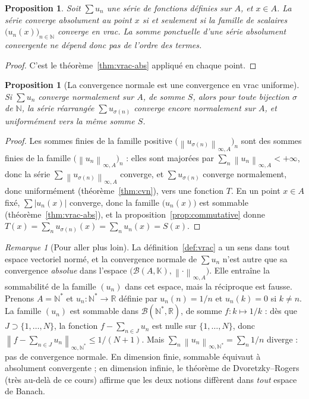 \documentclass[11pt,a4paper]{article}
\theoremstyle{plain}
\newtheorem{proposition}[theoreme]{Proposition}
\theoremstyle{definition}
\theoremstyle{remark}
\newtheorem{remarque}[theoreme]{Remarque}
\newcommand{\R}{\mathbb{R}}
\newcommand{\N}{\mathbb{N}}
\newcommand{\K}{\mathbb{K}}
\newcommand{\Ninf}[2]{\left\lVert #1 \right\rVert_{\infty,#2}}
\numberwithin{equation}{section}
\begin{document}
\begin{proposition}\label{prop:cva-vrac}
Soit $\sum u_n$ une série de fonctions définies sur $A$, et $x\in A$. La
série converge absolument au point $x$ si et seulement si la famille de
scalaires $\bigl(u_n(x)\bigr)_{n\in\N}$ converge en vrac. La somme
ponctuelle d'une série absolument convergente ne dépend donc pas de
l'ordre des termes.
\end{proposition}

\begin{proof}
C'est le théorème~\ref{thm:vrac-abs} appliqué en chaque point.
\end{proof}

\begin{proposition}[La convergence normale est une convergence en vrac uniforme]\label{prop:cvn-vrac}
Si $\sum u_n$ converge normalement sur $A$, de somme $S$, alors pour toute
bijection $\sigma$ de $\N$, la série réarrangée $\sum u_{\sigma(n)}$
converge encore normalement sur $A$, et uniformément vers la même somme
$S$.
\end{proposition}

\begin{proof}
Les sommes finies de la famille positive
$\bigl(\Ninf{u_{\sigma(n)}}{A}\bigr)_n$ sont des sommes finies de la
famille $\bigl(\Ninf{u_n}{A}\bigr)_n$ : elles sont majorées par
$\sum_{n}\Ninf{u_n}{A}<+\infty$, donc la série
$\sum\Ninf{u_{\sigma(n)}}{A}$ converge, et $\sum u_{\sigma(n)}$ converge
normalement, donc uniformément (théorème~\ref{thm:cvn}), vers une
fonction $T$. En un point $x\in A$ fixé, $\sum\lvert u_n(x)\rvert$
converge, donc la famille $\bigl(u_n(x)\bigr)$ est sommable
(théorème~\ref{thm:vrac-abs}), et la proposition~\ref{prop:commutative}
donne
$T(x)=\sum_{n}u_{\sigma(n)}(x)=\sum_{n}u_n(x)=S(x)$.
\end{proof}

\begin{remarque}[Pour aller plus loin]\label{rem:banach}
La définition~\ref{def:vrac} a un sens dans tout espace vectoriel normé,
et la convergence normale de $\sum u_n$ n'est autre que sa convergence
\emph{absolue} dans l'espace
$\bigl(\mathcal{B}(A,\K),\Ninf{\cdot}{A}\bigr)$. Elle entraîne la
sommabilité de la famille $(u_n)$ dans cet espace, mais la réciproque est
fausse. Prenons $A=\N^{*}$ et $u_n:\N^{*}\to\R$ définie par $u_n(n)=1/n$
et $u_n(k)=0$ si $k\neq n$. La famille $(u_n)$ est sommable dans
$\mathcal{B}(\N^{*},\R)$, de somme $f:k\mapsto 1/k$ : dès que
$J\supset\{1,\dots,N\}$, la fonction $f-\sum_{n\in J}u_n$ est nulle sur
$\{1,\dots,N\}$, donc $\Ninf{f-\sum_{n\in J}u_n}{\N^{*}}\leq 1/(N+1)$.
Mais $\sum_n\Ninf{u_n}{\N^{*}}=\sum_n 1/n$ diverge : pas de convergence
normale. En dimension finie, sommable équivaut à absolument convergente ;
en dimension infinie, le théorème de Dvoretzky--Rogers (très au-delà de ce
cours) affirme que les deux notions diffèrent dans \emph{tout} espace de
Banach.
\end{remarque}
\end{document}
